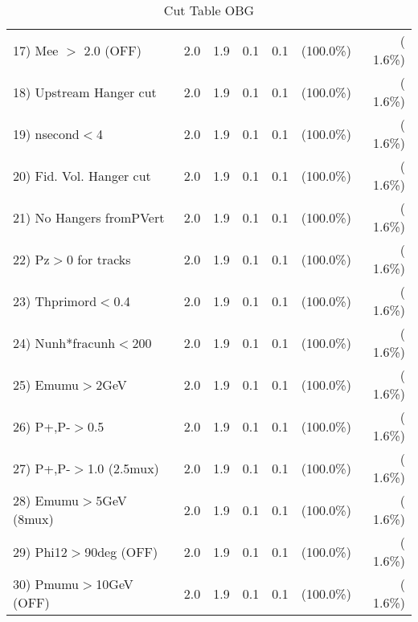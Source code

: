 \begin{table}[h!]
\begin{tabular}{||l||r|r|r|r|r|r||}
 17) Mee $>$ 2.0  (OFF)   &          2.0 &          1.9 &          0.1 &          0.1 & (100.0\%) & (  1.6\%) \\
 18) Upstream Hanger cut  &          2.0 &          1.9 &          0.1 &          0.1 & (100.0\%) & (  1.6\%) \\
 19) nsecond$<$4          &          2.0 &          1.9 &          0.1 &          0.1 & (100.0\%) & (  1.6\%) \\
 20) Fid. Vol. Hanger cut &          2.0 &          1.9 &          0.1 &          0.1 & (100.0\%) & (  1.6\%) \\
 21) No Hangers fromPVert &          2.0 &          1.9 &          0.1 &          0.1 & (100.0\%) & (  1.6\%) \\
 22) Pz$>$0 for tracks    &          2.0 &          1.9 &          0.1 &          0.1 & (100.0\%) & (  1.6\%) \\
 23) Thprimord$<$0.4      &          2.0 &          1.9 &          0.1 &          0.1 & (100.0\%) & (  1.6\%) \\
 24) Nunh*fracunh$<$200   &          2.0 &          1.9 &          0.1 &          0.1 & (100.0\%) & (  1.6\%) \\
 25) Emumu$>$2GeV         &          2.0 &          1.9 &          0.1 &          0.1 & (100.0\%) & (  1.6\%) \\
 26) P+,P-$>$0.5          &          2.0 &          1.9 &          0.1 &          0.1 & (100.0\%) & (  1.6\%) \\
 27) P+,P-$>$1.0 (2.5mux) &          2.0 &          1.9 &          0.1 &          0.1 & (100.0\%) & (  1.6\%) \\
 28) Emumu$>$5GeV  (8mux) &          2.0 &          1.9 &          0.1 &          0.1 & (100.0\%) & (  1.6\%) \\
 29) Phi12$>$90deg  (OFF) &          2.0 &          1.9 &          0.1 &          0.1 & (100.0\%) & (  1.6\%) \\
 30) Pmumu$>$10GeV  (OFF) &          2.0 &          1.9 &          0.1 &          0.1 & (100.0\%) & (  1.6\%) \\
 \hline
 \hline
 \end{tabular}
 \caption{Cut Table  OBG      }
 \label{tab-cutcohjpsi-mumu_qe}
 \end{table}
